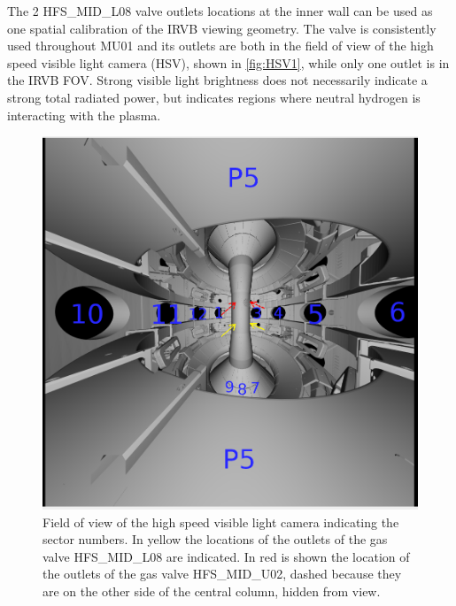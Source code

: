 The 2 HFS\_MID\_L08 valve outlets locations at the inner wall can be used as one spatial calibration of the IRVB viewing geometry. The valve is consistently used throughout MU01 and its outlets are both in the field of view of the high speed visible light camera (HSV), shown in \autoref{fig:HSV1}, while only one outlet is in the IRVB FOV. Strong visible light brightness does not necessarily indicate a strong total radiated power, but indicates regions where neutral hydrogen is interacting with the plasma.\cite{Walkden2017}

\begin{figure}
	\centering
	\includegraphics[width=0.6\linewidth,trim={0 0 0 0},clip]{Chapters/chapter2/figs/hsv_FOV2.png}
	\caption{Field of view of the high speed visible light camera indicating the sector numbers. In yellow the locations of the outlets of the gas valve HFS\_MID\_L08 are indicated. In red is shown the location of the outlets of the gas valve HFS\_MID\_U02, dashed because they are on the other side of the central column, hidden from view.}
	\label{fig:HSV1}
\end{figure}


